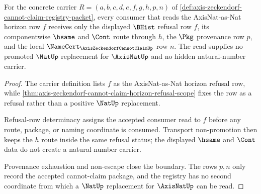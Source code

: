 \begin{theorem}
\label{thm:axis-zeckendorf-axisnat-nat-refusal-boundary}
For the concrete carrier $R=(a,b,c,d,e,f,g,h,p,n)$ of \autoref{def:axis-zeckendorf-cannot-claim-registry-packet}, every consumer that reads the AxisNat-as-Nat horizon row $f$ receives only the displayed $\BHist$ refusal row $f$, its componentwise $\hsame$ and $\Cont$ route through $h$, the $\Pkg$ provenance row $p$, and the local $\NameCert_{\AxisZeckendorfCannotClaimUp}$ row $n$. The read supplies no promoted $\NatUp$ replacement for $\AxisNatUp$ and no hidden natural-number carrier.
\end{theorem}
\begin{proof}
The carrier definition lists $f$ as the AxisNat-as-Nat horizon refusal row, while \autoref{thm:axis-zeckendorf-cannot-claim-horizon-refusal-scope} fixes the row as a refusal rather than a positive $\NatUp$ replacement.

Refusal-row determinacy assigns the accepted consumer read to $f$ before any route, package, or naming coordinate is consumed. Transport non-promotion then keeps the $h$ route inside the same refusal status; the displayed $\hsame$ and $\Cont$ data do not create a natural-number carrier.

Provenance exhaustion and non-escape close the boundary. The rows $p,n$ only record the accepted cannot-claim package, and the registry has no second coordinate from which a $\NatUp$ replacement for $\AxisNatUp$ can be read.
\end{proof}


